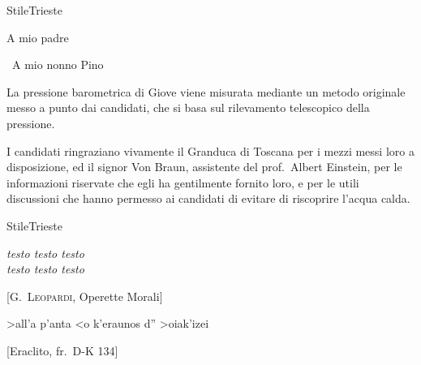 \documentclass[b5paper,10pt,twoside,cucitura]{toptesi}
\begin{document}



\expandafter\ifx\csname StileTrieste\endcsname\relax
    \frontespizio
\else
    \paginavuota
    \begin{dedica}
        A mio padre

        \textdagger\ A mio nonno Pino
    \end{dedica}
    \tomo
\fi


\sommario

 La pressione barometrica di Giove viene misurata
mediante un metodo originale  messo a punto dai candidati, che si basa
sul rilevamento telescopico della pressione.

\ringraziamenti

I candidati ringraziano vivamente il Granduca di Toscana per i mezzi
messi loro a disposizione, ed il signor Von Braun, assistente del
prof.~Albert Einstein, per le informazioni riservate che egli ha
gentilmente fornito loro, e per le utili discussioni che hanno permesso
ai candidati di evitare di riscoprire l'acqua calda.

\tablespagetrue\figurespagetrue %
\indici

\expandafter\ifx\csname StileTrieste\endcsname\relax
\else
    \begin{citazioni}
        \textit{testo testo testo\\testo testo testo}

        [\textsc{G.\ Leopardi}, Operette Morali]

        \textgreek{>all'a p'anta <o k'eraunos d'' >oiak'izei}

        [Eraclito, fr.\ D-K 134]
    \end{citazioni}
\end{document}
